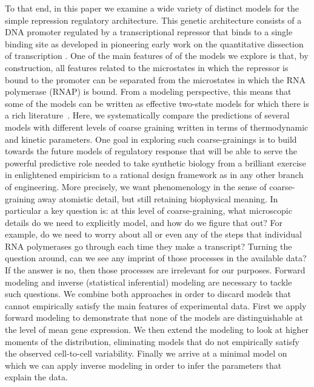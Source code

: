 To that end, in this paper we examine a wide variety of distinct models for the
simple repression regulatory architecture. This genetic architecture consists of
a DNA promoter regulated by a transcriptional repressor that binds to a single
binding site as developed in pioneering early work on the quantitative
dissection of transcription \cite{Oehler1994, Oehler1990}. One of the main
features of of the models we explore is that, by construction, all features
related to the microstates in which the repressor is bound to the promoter can
be separated from the microstates in which the RNA polymerase (RNAP) is bound.
From a modeling perspective, this means that some of the models can be written
as effective two-state models for which there is a rich
literature~\cite{Peccoud1995, Shahrezaei2008, Iyer-Biswas2009, Tkacik2009,
Sanchez2013, Jones2014, So2011, Munsky2012}. Here, we systematically compare the
predictions of several models with different levels of coarse graining written
in terms of thermodynamic and kinetic parameters. One goal in exploring such
coarse-grainings is to build towards the future models of regulatory response
that will be able to serve the powerful predictive role needed to take synthetic
biology from a brilliant exercise in enlightened empiricism to a rational design
framework as in any other branch of engineering. More precisely, we want
phenomenology in the sense of coarse-graining away atomistic detail, but still
retaining biophysical meaning. In particular a key question is: at this level of
coarse-graining, what microscopic details do we need to explicitly model, and
how do we figure that out? For example, do we need to worry about all or even
any of the steps that individual RNA polymerases go through each time they make
a transcript? Turning the question around, can we see any imprint of those
processes in the available data? If the answer is no, then those processes are
irrelevant for our purposes. Forward modeling and inverse (statistical
inferential) modeling are necessary to tackle such questions. We combine both
approaches in order to discard models that cannot empirically satisfy the main
features of experimental data. First we apply forward modeling to demonstrate
that none of the models are distinguishable at the level of mean gene
expression. We then extend the modeling to look at higher moments of the
distribution, eliminating models that do not empirically satisfy the observed
cell-to-cell variability. Finally we arrive at a minimal model on which we can
apply inverse modeling in order to infer the parameters that explain the data.

